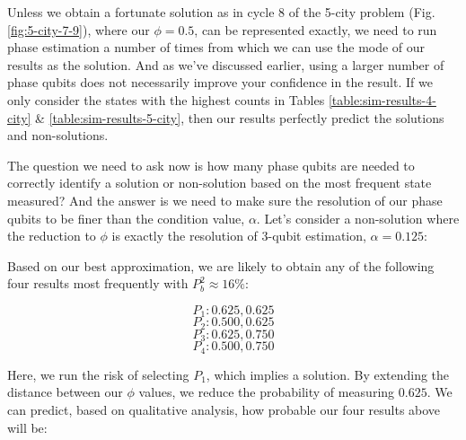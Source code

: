 \documentclass[msc,oneside]{ubcthesis}
\begin{document}
Unless we obtain a fortunate solution as in cycle 8 of the 5-city problem (Fig. \ref{fig:5-city-7-9}), where our $\phi = 0.5$, can be represented exactly, we need to run phase estimation a number of times from which we can use the mode of our results as the solution. And as we've discussed earlier, using a larger number of phase qubits does not necessarily improve your confidence in the result. If we only consider the states with the highest counts in Tables \ref{table:sim-results-4-city} \& \ref{table:sim-results-5-city}, then our results perfectly predict the solutions and non-solutions.
	
The question we need to ask now is how many phase qubits are needed to correctly identify a solution or non-solution based on the most frequent state measured? And the answer is we need to make sure the resolution of our phase qubits to be finer than the condition value, $\alpha$. Let's consider a non-solution where the reduction to $\phi$ is exactly the resolution of 3-qubit estimation, $\alpha = 0.125$:
	
	
	
	
	Based on our best approximation, we are likely to obtain any of the following four results most frequently with $P^2_b \approx 16\%$:

	$$P_1: 0.625, 0.625$$
	$$P_2: 0.500, 0.625$$
	$$P_3: 0.625, 0.750$$
	$$P_4: 0.500, 0.750$$
	
	Here, we run the risk of selecting $P_1$, which implies a solution. By extending the distance between our $\phi$ values, we reduce the probability of measuring $0.625$. We can predict, based on qualitative analysis, how probable our four results above will be:
	
	
\end{document}

